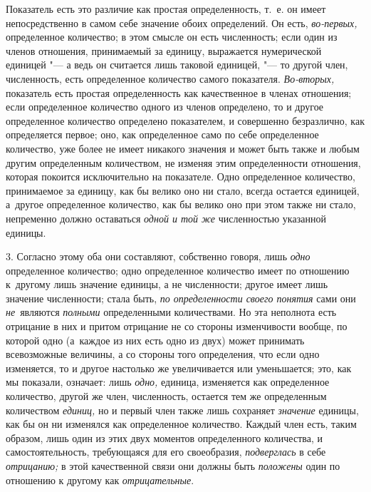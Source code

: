 Показатель есть это различие как простая определенность, т.~е. он имеет
непосредственно в самом себе значение обоих определений. Он есть, {\em
во-первых,} определенное количество; в этом смысле он есть численность; если
один из членов отношения, принимаемый за единицу, выражается нумерической
единицей "--- а ведь он считается лишь таковой единицей, "--- то другой член,
численность, есть определенное количество самого показателя. {\em Во-вторых,}
показатель есть простая определенность как качественное в членах отношения;
если определенное количество одного из членов определено, то и другое
определенное количество определено показателем, и совершенно безразлично, как
определяется первое; оно, как определенное само по себе определенное
количество, уже более не имеет никакого значения и может быть также и любым
другим определенным количеством, не изменяя этим определенности отношения,
которая покоится исключительно на показателе. Одно определенное количество,
принимаемое за единицу, как бы велико оно ни стало, всегда остается единицей,
а~другое определенное количество, как бы велико оно при этом также ни стало,
непременно должно оставаться {\em одной и той же} численностью указанной
единицы.

3. Согласно этому оба они составляют, собственно говоря, лишь {\em одно}
определенное количество; одно определенное количество имеет по отношению
к~другому лишь значение единицы, а не численности; другое имеет лишь значение
численности; стала быть, {\em по определенности своего понятия} сами они
{\em не}~являются {\em полными} определенными количествами. Но эта неполнота
есть отрицание в них и притом отрицание не со стороны изменчивости вообще, по
которой одно (а~каждое из них есть одно из двух) может принимать всевозможные
величины, а со стороны того определения, что если одно изменяется, то и другое
настолько же увеличивается или уменьшается; это, как мы показали, означает:
лишь {\em одно,} единица, изменяется как определенное количество, другой же
член, численность, остается тем же определенным количеством {\em единиц,} но и
первый член также лишь сохраняет {\em значение} единицы, как бы он ни изменялся
как определенное количество. Каждый член есть, таким образом, лишь один из этих
двух моментов определенного количества, и самостоятельность, требующаяся для
его своеобразия, {\em подверглась} в себе {\em отрицанию;} в этой качественной
связи они должны быть {\em положены} один по отношению к другому как
{\em отрицательные}.

